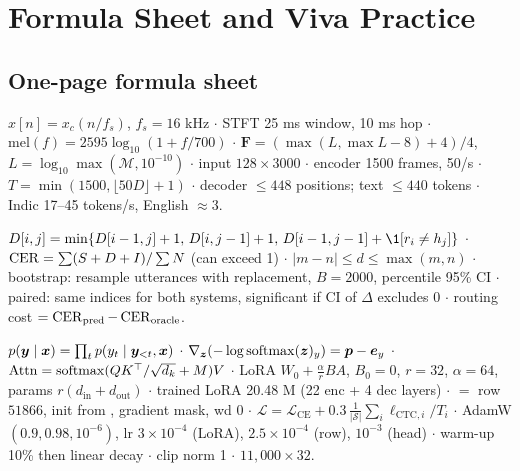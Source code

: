 \chapter{Formula Sheet and Viva Practice}
\label{ch:formulas}

\section{One-page formula sheet}

\begin{tcolorbox}[colback=white,colframe=titleblue,title={Audio and Whisper}]
$x[n]=x_c(n/f_s)$, $f_s=16$ kHz $\cdot$ STFT 25 ms window, 10 ms hop $\cdot$ $\mathrm{mel}(f)=2595\log_{10}(1+f/700)$ $\cdot$
$\bm F=(\max(L,\max L-8)+4)/4$, $L=\log_{10}\max(\mathcal M,10^{-10})$ $\cdot$ input $128\times3000$ $\cdot$ encoder 1500 frames, 50/s
$\cdot$ $T=\min(1500,\lfloor50D\rfloor+1)$ $\cdot$ decoder $\le448$ positions; text $\le440$ tokens $\cdot$ Indic 17--45 tokens/s,
English $\approx3$.
\end{tcolorbox}

\begin{tcolorbox}[colback=white,colframe=titleblue,title={Metrics and statistics}]
$D[i,j]=\min\{D[i-1,j]+1,\,D[i,j-1]+1,\,D[i-1,j-1]+\1[r_i\ne h_j]\}$ $\cdot$ $\operatorname{CER}=\sum(S+D+I)/\sum N$ (can exceed 1) $\cdot$
$|m-n|\le d\le\max(m,n)$ $\cdot$ bootstrap: resample utterances with replacement, $B=2000$, percentile 95\% CI $\cdot$ paired:
same indices for both systems, significant if CI of $\Delta$ excludes 0 $\cdot$ routing cost $=\operatorname{CER}_{\text{pred}}-\operatorname{CER}_{\text{oracle}}$.
\end{tcolorbox}

\begin{tcolorbox}[colback=white,colframe=titleblue,title={Model and training}]
$p(\bm{y}\mid\bm{x})=\prod_tp(y_t\mid\bm{y}_{<t},\bm{x})$ $\cdot$ $\nabla_{\bm{z}}(-\log\operatorname{softmax}(\bm{z})_y)=\bm p-\bm e_y$ $\cdot$
$\mathrm{Attn}=\operatorname{softmax}(QK^\top/\sqrt{d_k}+M)V$ $\cdot$ LoRA $W_0+\frac\alpha rBA$, $B_0=0$, $r=32$, $\alpha=64$, params $r(d_{\text{in}}+d_{\text{out}})$
$\cdot$ trained LoRA 20.48 M (22 enc + 4 dec layers) $\cdot$  $=$ row $51866$, init from , gradient mask, wd 0 $\cdot$
$\mathcal L=\mathcal L_{\text{CE}}+0.3\,\frac{1}{|\mathcal S|}\sum_i\ell_{\text{CTC},i}/T_i$ $\cdot$ AdamW $(0.9,0.98,10^{-6})$, lr $3\times10^{-4}$
(LoRA), $2.5\times10^{-4}$ (row), $10^{-3}$ (head) $\cdot$ warm-up 10\% then linear decay $\cdot$ clip norm 1 $\cdot$ $11{,}000\times32$.
\end{tcolorbox}

